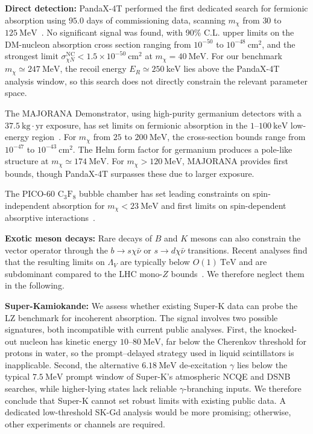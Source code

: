 \documentclass[aps,twocolumn,superscriptaddress,groupedaddress,nofootinbib,floatfix]{revtex4}
\begin{document}
\textbf{Direct detection:} PandaX-4T performed the first dedicated search for fermionic absorption using $95.0$ days of commissioning data, scanning $m_\chi$ from $30$ to $125\ \text{MeV}$~\cite{PandaX:2022osq}. No significant signal was found, with 90\% C.L. upper limits on the DM-nucleon absorption cross section ranging from $10^{-50}$ to $10^{-48}\ \text{cm}^2$, and the strongest limit $\sigma_{\chi N}^{\text{NC}} < 1.5\times10^{-50}\ \text{cm}^2$ at $m_\chi = 40\ \text{MeV}$. For our benchmark $m_\chi \simeq 247\ \text{MeV}$, the recoil energy $E_R \simeq 250\ \text{keV}$ lies above the PandaX-4T analysis window, so this search does not directly constrain the relevant parameter space.

The MAJORANA Demonstrator, using high-purity germanium detectors with a $37.5\ \text{kg}\cdot\text{yr}$ exposure, has set limits on fermionic absorption in the $1$--$100\ \text{keV}$ low-energy region~\cite{Majorana:2022gtu}. For $m_\chi$ from $25$ to $200\ \text{MeV}$, the cross-section bounds range from $10^{-47}$ to $10^{-43}\ \text{cm}^2$. The Helm form factor for germanium produces a pole-like structure at $m_\chi \simeq 174\ \text{MeV}$. For $m_\chi > 120\ \text{MeV}$, MAJORANA provides first bounds, though PandaX-4T surpasses these due to larger exposure.

The PICO-60 $\mathrm{C_3F_8}$ bubble chamber has set leading constraints on spin-independent absorption for $m_\chi < 23\ \text{MeV}$ and first limits on spin-dependent absorptive interactions~\cite{PICO:2025rku}. 

\textbf{Exotic meson decays:} Rare decays of $B$ and $K$ mesons can also constrain the vector operator through the $b\to s \chi \bar\nu$ or $s\to d \chi \bar\nu$ transitions. Recent analyses find that the resulting limits on $\Lambda_V$ are typically below $O(1)\ \text{TeV}$ and are subdominant compared to the LHC mono-$Z$ bounds~\cite{Feng:2026jsi}. We therefore neglect them in the following.

\textbf{Super-Kamiokande:} We assess whether existing Super-K data can probe the LZ benchmark for incoherent absorption. The signal involves two possible signatures, both incompatible with current public analyses. First, the knocked-out nucleon has kinetic energy $10$--$80\ \text{MeV}$, far below the Cherenkov threshold for protons in water, so the prompt–delayed strategy used in liquid scintillators is inapplicable. Second, the alternative $6.18\ \text{MeV}$ de-excitation $\gamma$ lies below the typical $7.5\ \text{MeV}$ prompt window of Super-K's atmospheric NCQE and DSNB searches, while higher-lying states lack reliable $\gamma$-branching inputs. We therefore conclude that Super-K cannot set robust limits with existing public data. A dedicated low-threshold SK-Gd analysis would be more promising; otherwise, other experiments or channels are required.
\end{document}
